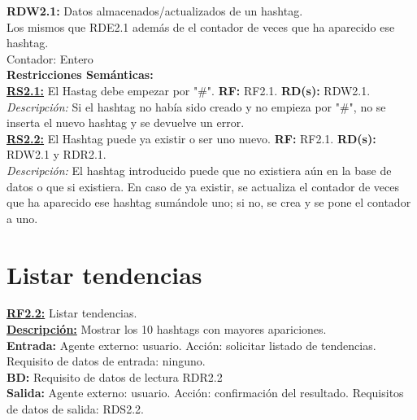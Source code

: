 \textcolor{azul}{\textbf{RDW2.1:}} Datos almacenados/actualizados de un hashtag. \\
\hspace*{1cm} Los mismos que RDE2.1 además de el contador de veces que ha aparecido ese hashtag.\\
\hspace*{1cm} Contador: Entero \\[12pt]

\textbf{\textcolor{verde}{Restricciones Semánticas:}} \\[6pt]
\textbf{\textcolor{verde}{\underline{RS2.1:}}} El Hastag debe empezar por "\#". \textbf{RF:} RF2.1. \textbf{RD(s):} RDW2.1. \\
\hspace*{1cm} \textit{Descripción:} Si el hashtag no había sido creado y no empieza por "\#", no se inserta el nuevo hashtag y se devuelve un error. \\[6pt]

\textbf{\textcolor{verde}{\underline{RS2.2:}}} El Hashtag puede ya existir o ser uno nuevo. \textbf{RF:} RF2.1. \textbf{RD(s):} RDW2.1 y RDR2.1. \\
\hspace*{1cm} \textit{Descripción:} El hashtag introducido puede que no existiera aún en la base de datos o que si existiera. En caso de ya existir, se actualiza el contador de veces que ha aparecido ese hashtag sumándole uno; si no, se crea y se pone el contador a uno.\\[6pt]
\pagebreak

\section{Listar tendencias}
\textbf{\textcolor{rojo}{\underline{RF2.2:}}} Listar tendencias. \\[6pt]

\textbf{\textcolor{rojo}{\underline{Descripción:}}} Mostrar los 10 hashtags con mayores apariciones.
 \\[6pt]

\textbf{\textcolor{rojo}{Entrada:}} Agente externo: usuario. Acción: solicitar listado de tendencias. 
Requisito de datos de entrada: ninguno. \\[6pt]

\textbf{\textcolor{rojo}{BD:}} Requisito de datos de lectura \textcolor{azul}{RDR2.2}\\[6pt]

\textbf{\textcolor{rojo}{Salida:}} Agente externo: usuario. Acción: confirmación del resultado.
Requisitos de datos de salida: \textcolor{azul}{RDS2.2}. \\[6pt] 

